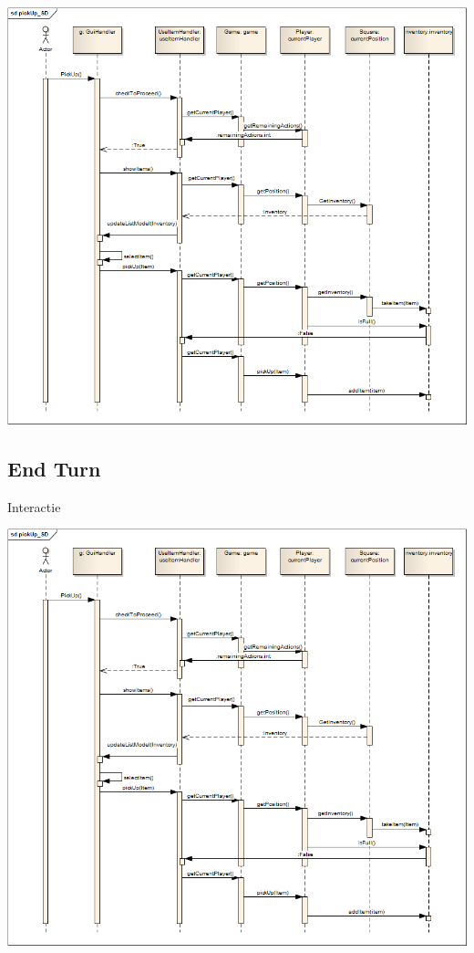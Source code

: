 \documentclass[t]{beamer}
\begin{document}
\begin{frame}[plain]
\begin{center}
\includegraphics[width= 0.90\linewidth]{../uml/pickup_SD.png}
\end{center}
\end{frame}

\subsection{End Turn}
\begin{frame}{Interactie}
\begin{multicols}{2}
\tableofcontents[currentsection]
\end{multicols}
\end{frame}

\begin{frame}[plain]
\begin{center}
\includegraphics[width= 0.90\linewidth]{../uml/pickup_SD.png}
\end{center}
\end{frame}
\end{document}
